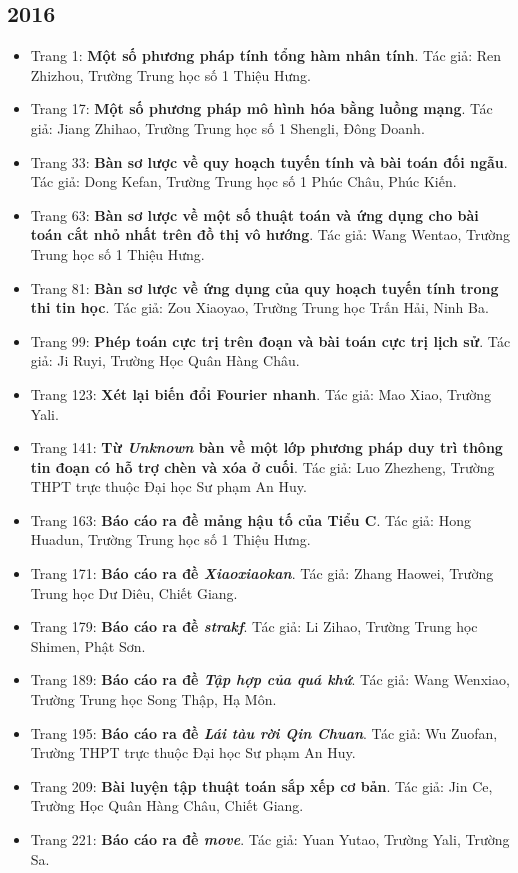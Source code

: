 \documentclass[11pt]{article}
\begin{document}
\subsection{2016}
\begin{itemize}[leftmargin=2em]
  \item Trang 1: \textbf{Một số phương pháp tính tổng hàm nhân tính}. Tác giả: Ren Zhizhou, Trường Trung học số 1 Thiệu Hưng.
  \item Trang 17: \textbf{Một số phương pháp mô hình hóa bằng luồng mạng}. Tác giả: Jiang Zhihao, Trường Trung học số 1 Shengli, Đông Doanh.
  \item Trang 33: \textbf{Bàn sơ lược về quy hoạch tuyến tính và bài toán đối ngẫu}. Tác giả: Dong Kefan, Trường Trung học số 1 Phúc Châu, Phúc Kiến.
  \item Trang 63: \textbf{Bàn sơ lược về một số thuật toán và ứng dụng cho bài toán cắt nhỏ nhất trên đồ thị vô hướng}. Tác giả: Wang Wentao, Trường Trung học số 1 Thiệu Hưng.
  \item Trang 81: \textbf{Bàn sơ lược về ứng dụng của quy hoạch tuyến tính trong thi tin học}. Tác giả: Zou Xiaoyao, Trường Trung học Trấn Hải, Ninh Ba.
  \item Trang 99: \textbf{Phép toán cực trị trên đoạn và bài toán cực trị lịch sử}. Tác giả: Ji Ruyi, Trường Học Quân Hàng Châu.
  \item Trang 123: \textbf{Xét lại biến đổi Fourier nhanh}. Tác giả: Mao Xiao, Trường Yali.
  \item Trang 141: \textbf{Từ \emph{Unknown} bàn về một lớp phương pháp duy trì thông tin đoạn có hỗ trợ chèn và xóa ở cuối}. Tác giả: Luo Zhezheng, Trường THPT trực thuộc Đại học Sư phạm An Huy.
  \item Trang 163: \textbf{Báo cáo ra đề mảng hậu tố của Tiểu C}. Tác giả: Hong Huadun, Trường Trung học số 1 Thiệu Hưng.
  \item Trang 171: \textbf{Báo cáo ra đề \emph{Xiaoxiaokan}}. Tác giả: Zhang Haowei, Trường Trung học Dư Diêu, Chiết Giang.
  \item Trang 179: \textbf{Báo cáo ra đề \emph{strakf}}. Tác giả: Li Zihao, Trường Trung học Shimen, Phật Sơn.
  \item Trang 189: \textbf{Báo cáo ra đề \emph{Tập hợp của quá khứ}}. Tác giả: Wang Wenxiao, Trường Trung học Song Thập, Hạ Môn.
  \item Trang 195: \textbf{Báo cáo ra đề \emph{Lái tàu rời Qin Chuan}}. Tác giả: Wu Zuofan, Trường THPT trực thuộc Đại học Sư phạm An Huy.
  \item Trang 209: \textbf{Bài luyện tập thuật toán sắp xếp cơ bản}. Tác giả: Jin Ce, Trường Học Quân Hàng Châu, Chiết Giang.
  \item Trang 221: \textbf{Báo cáo ra đề \emph{move}}. Tác giả: Yuan Yutao, Trường Yali, Trường Sa.
\end{itemize}
\end{document}
